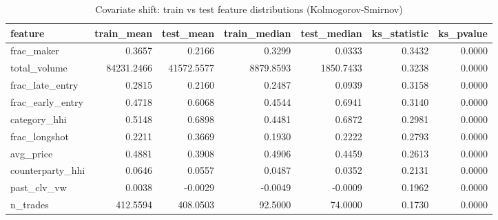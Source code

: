 \begin{table}
\caption{Covariate shift: train vs test feature distributions (Kolmogorov-Smirnov)}
\label{tab:covshift}
\begin{tabular}{lrrrrrr}
\toprule
feature & train_mean & test_mean & train_median & test_median & ks_statistic & ks_pvalue \\
\midrule
frac_maker & 0.3657 & 0.2166 & 0.3299 & 0.0333 & 0.3432 & 0.0000 \\
total_volume & 84231.2466 & 41572.5577 & 8879.8593 & 1850.7433 & 0.3238 & 0.0000 \\
frac_late_entry & 0.2815 & 0.2160 & 0.2487 & 0.0939 & 0.3158 & 0.0000 \\
frac_early_entry & 0.4718 & 0.6068 & 0.4544 & 0.6941 & 0.3140 & 0.0000 \\
category_hhi & 0.5148 & 0.6898 & 0.4481 & 0.6872 & 0.2981 & 0.0000 \\
frac_longshot & 0.2211 & 0.3669 & 0.1930 & 0.2222 & 0.2793 & 0.0000 \\
avg_price & 0.4881 & 0.3908 & 0.4906 & 0.4459 & 0.2613 & 0.0000 \\
counterparty_hhi & 0.0646 & 0.0557 & 0.0487 & 0.0352 & 0.2131 & 0.0000 \\
past_clv_vw & 0.0038 & -0.0029 & -0.0049 & -0.0009 & 0.1962 & 0.0000 \\
n_trades & 412.5594 & 408.0503 & 92.5000 & 74.0000 & 0.1730 & 0.0000 \\
\bottomrule
\end{tabular}
\end{table}
